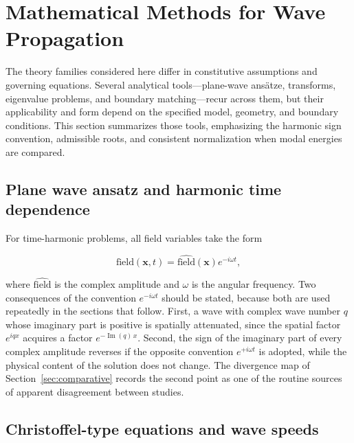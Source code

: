 \section{Mathematical Methods for Wave Propagation}
\label{sec:methods}

The theory families considered here differ in constitutive assumptions and governing equations. Several analytical tools---plane-wave ansätze, transforms, eigenvalue problems, and boundary matching---recur across them, but their applicability and form depend on the specified model, geometry, and boundary conditions. This section summarizes those tools, emphasizing the harmonic sign convention, admissible roots, and consistent normalization when modal energies are compared.

\subsection{Plane wave ansatz and harmonic time dependence}
\label{sec:8.1}

For time-harmonic problems, all field variables take the form

\begin{equation}
\text{field}(\bm{x},t) = \hat{\text{field}}(\bm{x}) e^{-i\omega t},
\label{eq:8.1}
\end{equation}

where $\hat{\text{field}}$ is the complex amplitude and $\omega$ is the angular frequency. Two consequences of the convention $e^{-i\omega t}$ should be stated, because both are used repeatedly in the sections that follow. First, a wave with complex wave number $q$ whose imaginary part is positive is spatially attenuated, since the spatial factor $e^{iqx}$ acquires a factor $e^{-\operatorname{Im}(q)\,x}$. Second, the sign of the imaginary part of every complex amplitude reverses if the opposite convention $e^{+i\omega t}$ is adopted, while the physical content of the solution does not change. The divergence map of Section~\ref{sec:comparative} records the second point as one of the routine sources of apparent disagreement between studies.

\subsection{Christoffel-type equations and wave speeds}
\label{sec:8.2}

